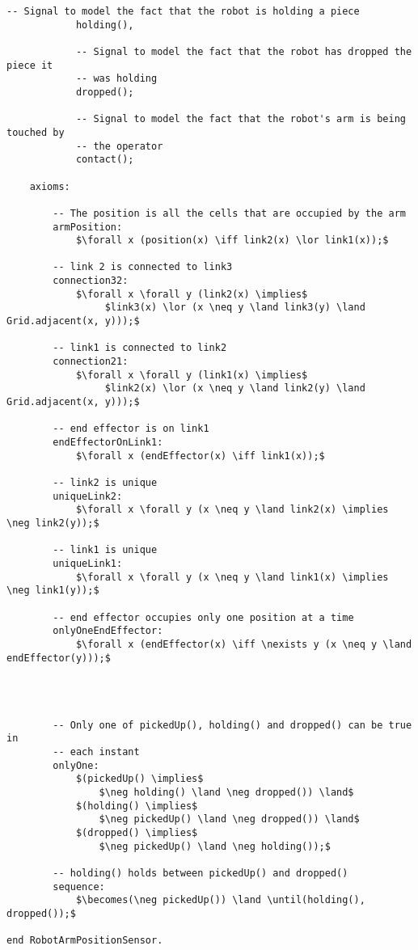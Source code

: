 \begin{lstlisting}[fontadjust, mathescape, frame=single]
            -- Signal to model the fact that the robot is holding a piece
            holding(),

            -- Signal to model the fact that the robot has dropped the piece it
            -- was holding
            dropped();

            -- Signal to model the fact that the robot's arm is being touched by
            -- the operator
            contact();

    axioms:

        -- The position is all the cells that are occupied by the arm
        armPosition: 
            $\forall x (position(x) \iff link2(x) \lor link1(x));$
        
        -- link 2 is connected to link3
        connection32: 
            $\forall x \forall y (link2(x) \implies$
                 $link3(x) \lor (x \neq y \land link3(y) \land Grid.adjacent(x, y)));$

        -- link1 is connected to link2
        connection21: 
            $\forall x \forall y (link1(x) \implies$ 
                 $link2(x) \lor (x \neq y \land link2(y) \land Grid.adjacent(x, y)));$

        -- end effector is on link1
        endEffectorOnLink1:
            $\forall x (endEffector(x) \iff link1(x));$

        -- link2 is unique
        uniqueLink2: 
            $\forall x \forall y (x \neq y \land link2(x) \implies \neg link2(y));$

        -- link1 is unique
        uniqueLink1: 
            $\forall x \forall y (x \neq y \land link1(x) \implies \neg link1(y));$

        -- end effector occupies only one position at a time
        onlyOneEndEffector:
            $\forall x (endEffector(x) \iff \nexists y (x \neq y \land endEffector(y)));$

            


        -- Only one of pickedUp(), holding() and dropped() can be true in 
        -- each instant
        onlyOne:
            $(pickedUp() \implies$
                $\neg holding() \land \neg dropped()) \land$
            $(holding() \implies$ 
                $\neg pickedUp() \land \neg dropped()) \land$
            $(dropped() \implies$
                $\neg pickedUp() \land \neg holding());$

        -- holding() holds between pickedUp() and dropped()
        sequence:
            $\becomes(\neg pickedUp()) \land \until(holding(), dropped());$

end RobotArmPositionSensor.
\end{lstlisting}